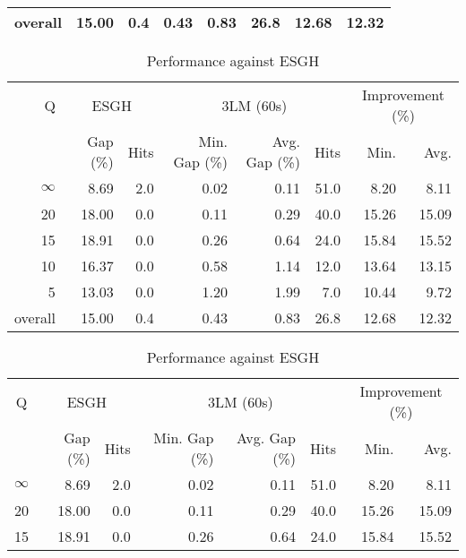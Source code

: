\begin{table}[H]
\begin{tabular}{r rr rrr rr}
\midrule
 overall &    15.00 &  0.4 &          0.43 &          0.83 & 26.8 &            12.68 & 12.32 \\
\bottomrule
\end{tabular}
\end{table}\begin{table}[H]
\centering
\caption{Performance against ESGH}
\label{tab:3lm_resuts_kritikos1}
\begin{tabular}{r rr rrr rr}
\toprule
       Q & \multicolumn{2}{c}{ESGH} & \multicolumn{3}{c}{3LM (60s)} & \multicolumn{2}{c}{Improvement (\%)} \\
         & Gap (\%) & Hits & Min. Gap (\%) & Avg. Gap (\%) & Hits &             Min. &  Avg. \\
\midrule
$\infty$ &     8.69 &  2.0 &          0.02 &          0.11 & 51.0 &             8.20 &  8.11 \\
      20 &    18.00 &  0.0 &          0.11 &          0.29 & 40.0 &            15.26 & 15.09 \\
      15 &    18.91 &  0.0 &          0.26 &          0.64 & 24.0 &            15.84 & 15.52 \\
      10 &    16.37 &  0.0 &          0.58 &          1.14 & 12.0 &            13.64 & 13.15 \\
       5 &    13.03 &  0.0 &          1.20 &          1.99 &  7.0 &            10.44 &  9.72 \\
\midrule
 overall &    15.00 &  0.4 &          0.43 &          0.83 & 26.8 &            12.68 & 12.32 \\
\bottomrule
\end{tabular}
\end{table}\begin{table}[H]
\centering
\caption{Performance against ESGH}
\label{tab:3lm_resuts_kritikos1}
\begin{tabular}{c rr rrr rr}
\toprule
       Q & \multicolumn{2}{c}{ESGH} & \multicolumn{3}{c}{3LM (60s)} & \multicolumn{2}{c}{Improvement (\%)} \\
         & Gap (\%) & Hits & Min. Gap (\%) & Avg. Gap (\%) & Hits &             Min. &  Avg. \\
\midrule
$\infty$ &     8.69 &  2.0 &          0.02 &          0.11 & 51.0 &             8.20 &  8.11 \\
      20 &    18.00 &  0.0 &          0.11 &          0.29 & 40.0 &            15.26 & 15.09 \\
      15 &    18.91 &  0.0 &          0.26 &          0.64 & 24.0 &            15.84 & 15.52 \\

\end{tabular}
\end{table}

